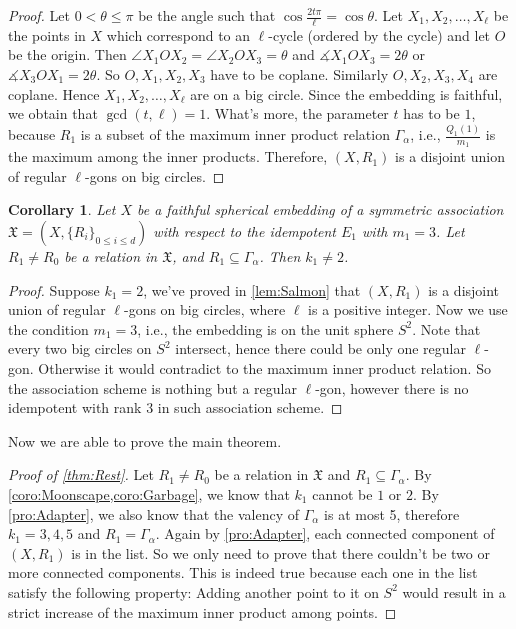 \documentclass[12pt]{amsart}
\newtheorem{corollary}[theorem]{Corollary}
\begin{document}
\begin{proof}
		Let $0 < \theta \leq \pi$ be the angle such that $\cos\frac{ 2t \pi}{\ell} = \cos \theta$. Let $X_1, X_2, \dots, X_\ell$ be the points in $X$ which correspond to an $\ell$-cycle (ordered by the cycle) and let $O$ be the origin. Then $\angle X_1 O X_2 = \angle X_2 O X_3 = \theta$ and $\measuredangle X_1 O X_3 = 2\theta$ or $\measuredangle X_3 O X_1 = 2\theta$. So $O, X_1, X_2, X_3$ have to be coplane. Similarly $O, X_2, X_3, X_4$ are coplane. Hence $X_1, X_2, \dots, X_\ell$ are on a big circle. Since the embedding is faithful, we obtain that $\gcd(t,\ell) = 1$. What's more, the parameter $t$ has to be $1$, because $R_1$ is a subset of the maximum inner product relation $\Gamma_\alpha$, i.e., $\frac{Q_1(1)}{m_1}$ is the maximum among the inner products. Therefore, $(X,R_1)$ is a disjoint union of regular $\ell$-gons on big circles.
	\end{proof}

	\begin{corollary} \label{coro:Garbage}
		Let $X$ be a faithful spherical embedding of a symmetric association $\mathfrak X=(X,\{R_i\}_{0\leq i\leq d})$ with respect to the idempotent $E_1$ with $m_1 = 3$. Let $R_1 \neq R_0$ be a relation in $\mathfrak{X}$, and $R_1 \subseteq \Gamma_\alpha$. Then $k_1 \neq 2$.
	\end{corollary}

	\begin{proof}
		Suppose $k_1 = 2$, we've proved in \cref{lem:Salmon} that $(X,R_1)$ is a disjoint union of regular $\ell$-gons on big circles, where $\ell$ is a positive integer. Now we use the condition $m_1 = 3$, i.e., the embedding is on the unit sphere $S^2$. Note that every two big circles on $S^2$ intersect, hence there could be only one regular $\ell$-gon. Otherwise it would contradict to the maximum inner product relation. So the association scheme is nothing but a regular $\ell$-gon, however there is no idempotent with rank $3$ in such association scheme.
	\end{proof}

	
			
	Now we are able to prove the main theorem.

	\begin{proof}[Proof of \cref{thm:Rest}]
		Let $R_1 \neq R_0$ be a relation in $\mathfrak X$ and $R_1 \subseteq \Gamma_\alpha$. By \cref{coro:Moonscape,coro:Garbage}, we know that $k_1$ cannot be $1$ or $2$. By \cref{pro:Adapter}, we also know that the valency of $\Gamma_\alpha$ is at most 5, therefore $k_1 = 3, 4, 5$ and $R_1 = \Gamma_\alpha$. 
				Again by \cref{pro:Adapter}, each connected component of $(X,R_1)$ is in the list. So we only need to prove that there couldn't be two or more connected components. This is indeed true because each one in the list satisfy the following property: Adding another point to it on $S^2$ would result in a strict increase of the maximum inner product among points.
	\end{proof}
\end{document}
